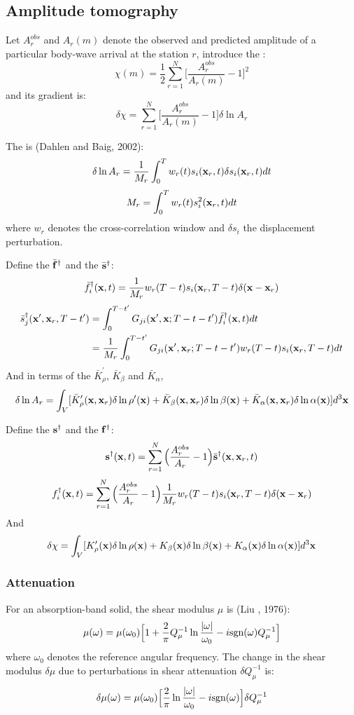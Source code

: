 \subsection{Amplitude tomography}
Let $A_r^{obs}$ and $A_r(m)$ denote the observed and predicted amplitude
of a particular body-wave arrival at the station $r$,
introduce the :
\[ \chi(m)=\frac{1}{2}\sum_{r=1}^N\Big[\frac{A_r^{obs}}{A_r(m)}-1\Big]^2 \]
and its gradient is:
\[ \delta\chi=\sum_{r=1}^N\Big[\frac{A_r^{obs}}{A_r(m)}-1\Big]\delta\ln A_r \]

The  is (Dahlen and Baig, 2002):
\[ \delta\ln A_r=\frac{1}{M_r}\int_0^Tw_r(t)s_i(\mathbf{x}_r,t)\delta s_i(\mathbf{x}_r,t)dt \]
\[ M_r=\int_0^Tw_r(t)s_i^2(\mathbf{x}_r,t)dt \]
where $w_r$ denotes the cross-correlation window and $\delta s_i$ the displacement perturbation.

Define the  $\bar{\mathbf{f}}^\dagger$
and the  $\bar{\mathbf{s}}^\dagger$:
\[ \bar f_i^\dagger(\mathbf{x},t)=\frac{1}{M_r}w_r(T-t)s_i(\mathbf{x}_r,T-t)\delta(\mathbf{x}-\mathbf{x}_r) \]
\begin{align*}
  \bar s_j^\dagger(\mathbf{x}',\mathbf{x}_r,T-t') & =\int_0^{T-t'}G_{ji}(\mathbf{x}',\mathbf{x};T-t-t')\bar f_i^\dagger(\mathbf{x},t) dt \\
    & =\frac{1}{M_r}\int_0^{T-t'}G_{ji}(\mathbf{x}',\mathbf{x}_r;T-t-t')w_r(T-t)s_i(\mathbf{x}_r,T-t)dt
\end{align*}
And in terms of the 
$\bar K_\rho^\prime$, $\bar K_\beta$ and $\bar K_\alpha$,
\[ \delta\ln A_r=\int_V[\bar K_\rho^\prime(\mathbf{x},\mathbf{x}_r)\delta\ln\rho^\prime(\mathbf{x})+\bar K_\beta(\mathbf{x},\mathbf{x}_r)\delta\ln\beta(\mathbf{x})+\bar K_\alpha(\mathbf{x},\mathbf{x}_r)\delta\ln\alpha(\mathbf{x})]d^3\mathbf{x} \]

Define the  $\mathbf{s}^\dagger$
and the  $\mathbf{f}^\dagger$:
\[ \mathbf{s}^\dagger(\mathbf{x},t)=\sum_{r=1}^N\Big(\frac{A_r^{obs}}{A_r}-1\Big)\bar{\mathbf{s}}^\dagger(\mathbf{x},\mathbf{x}_r,t) \]
\[ f_i^\dagger(\mathbf{x},t)=\sum_{r=1}^N\Big(\frac{A_r^{obs}}{A_r}-1\Big)\frac{1}{M_r}w_r(T-t)s_i(\mathbf{x}_r,T-t)\delta(\mathbf{x}-\mathbf{x}_r) \]
And
\[ \delta\chi=\int_V[K_\rho^\prime(\mathbf{x})\delta\ln\rho(\mathbf{x})+K_\beta(\mathbf{x})\delta\ln\beta(\mathbf{x})+K_\alpha(\mathbf{x})\delta\ln\alpha(\mathbf{x})]d^3\mathbf{x} \]

\subsubsection{Attenuation}
For an absorption-band solid, the shear modulus $\mu$ is (Liu \etal, 1976):
\[ \mu(\omega)=\mu(\omega_0)\Big[1+\frac{2}{\pi}Q_\mu^{-1}\ln\frac{|\omega|}{\omega_0}-i\text{sgn}(\omega)Q_\mu^{-1}\Big] \]
where $\omega_0$ denotes the reference angular frequency.
The change in the shear modulus $\delta\mu$
due to perturbations in shear attenuation $\delta Q_\mu^{-1}$ is:
\[ \delta\mu(\omega)=\mu(\omega_0)\Big[\frac{2}{\pi}\ln\frac{|\omega|}{\omega_0}-i\text{sgn}(\omega)\Big]\delta Q_\mu^{-1} \]

